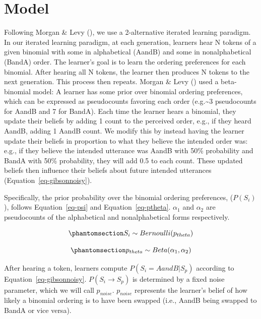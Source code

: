 \documentclass[
  12pt,
  letterpaper,
]{scrreprt}
\begin{document}
\section{Model}\label{model}

Following Morgan \& Levy
(),
we use a 2-alternative iterated learning paradigm. In our iterated
learning paradigm, at each generation, learners hear N tokens of a given
binomial with some in alphabetical (AandB) and some in nonalphabetical
(BandA) order. The learner's goal is to learn the ordering preferences
for each binomial. After hearing all N tokens, the learner then produces
N tokens to the next generation. This process then repeats. Morgan \&
Levy
()
used a beta-binomial model: A learner has some prior over binomial
ordering preferences, which can be expressed as pseudocounts favoring
each order (e.g.\textasciitilde3 pseudocounts for AandB and 7 for
BandA). Each time the learner hears a binomial, they update their
beliefs by adding 1 count to the perceived order, e.g., if they heard
AandB, adding 1 AandB count. We modify this by instead having the
learner update their beliefs in proportion to what they believe the
intended order was: e.g., if they believe the intended utterance was
AandB with 50\% probability and BandA with 50\% probability, they will
add 0.5 to each count. These updated beliefs then influence their
beliefs about future intended utterances
(Equation~\ref{eq-gibsonnoisy}).

Specifically, the prior probability over the binomial ordering
preferences, (\(P(S_i)\)), follows Equation~\ref{eq-psi} and
Equation~\ref{eq-ptheta}. \(\alpha_1\) and \(\alpha_2\) are pseudocounts
of the alphabetical and nonalphabetical forms respectively.

\begin{equation}\phantomsection\label{eq-psi}{
S_i \sim Bernoulli(p_{theta})
}\end{equation}

\begin{equation}\phantomsection\label{eq-ptheta}{
p_{theta} \sim Beta(\alpha_1, \alpha_2)
}\end{equation}

After hearing a token, learners compute \(P(S_i = AandB|S_p)\) according
to Equation~\ref{eq-gibsonnoisy}. \(P(S_i \to S_p)\) is determined by a
fixed noise parameter, which we will call \(p_{noise}\). \(p_{noise}\)
represents the learner's belief of how likely a binomial ordering is to
have been swapped (i.e., AandB being swapped to BandA or vice versa).
\end{document}
